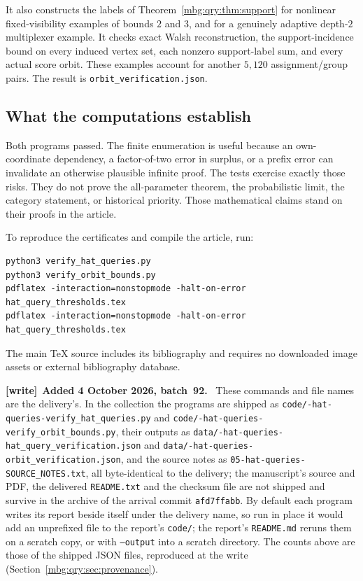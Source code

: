 \documentclass[11pt,letterpaper]{article}
\theoremstyle{definition}
\newenvironment{writenote}[1][]{\par\smallskip\begingroup\small
 \noindent\textbf{[write]}\if\relax\detokenize{#1}\relax\else~\textbf{#1.}\fi\ }%
 {\par\endgroup\smallskip}
\begin{document}
It also constructs the labels of Theorem~\ref{mbg:qry:thm:support} for nonlinear
fixed-visibility examples of bounds \(2\) and \(3\), and for a genuinely
adaptive depth-\(2\) multiplexer example. It checks exact Walsh
reconstruction, the support-incidence bound on every induced vertex
set, each nonzero support-label sum, and every actual score orbit.
These examples account for another \(5,120\) assignment/group pairs.
The result is \nolinkurl{orbit_verification.json}.

\subsection{What the computations establish}

Both programs passed. The finite enumeration is useful because an
own-coordinate dependency, a factor-of-two error in surplus, or a
prefix error can invalidate an otherwise plausible infinite proof.
The tests exercise exactly those risks. They do not prove the
all-parameter theorem, the probabilistic limit, the category statement,
or historical priority. Those mathematical claims stand on their
proofs in the article.

To reproduce the certificates and compile the article, run:
\begin{lstlisting}
python3 verify_hat_queries.py
python3 verify_orbit_bounds.py
pdflatex -interaction=nonstopmode -halt-on-error hat_query_thresholds.tex
pdflatex -interaction=nonstopmode -halt-on-error hat_query_thresholds.tex
\end{lstlisting}
The main TeX source includes its bibliography and requires no downloaded
image assets or external bibliography database.

\begin{writenote}[Added 4 October 2026, batch~92]
These commands and file names are the delivery's. In the collection the programs are shipped as \texttt{code/-hat-queries-\allowbreak verify\_\allowbreak hat\_\allowbreak queries.py} and \texttt{code/-hat-queries-\allowbreak verify\_\allowbreak orbit\_\allowbreak bounds.py}, their outputs as \texttt{data/-hat-queries-\allowbreak hat\_\allowbreak query\_\allowbreak verification.json} and \texttt{data/-hat-queries-\allowbreak orbit\_\allowbreak verification.json}, and the source notes as \texttt{05-hat-queries-\allowbreak SOURCE\_\allowbreak NOTES.txt}, all byte-identical to the delivery; the manuscript's source and PDF, the delivered \texttt{README.txt} and the checksum file are not shipped and survive in the archive of the arrival commit \texttt{afd7ffabb}. By default each program writes its report beside itself under the delivery name, so run in place it would add an unprefixed file to the report's \texttt{code/}; the report's \texttt{README.md} reruns them on a scratch copy, or with \texttt{--output} into a scratch directory. The counts above are those of the shipped JSON files, reproduced at the write (Section~\ref{mbg:qry:sec:provenance}).
\end{writenote}
\end{document}
